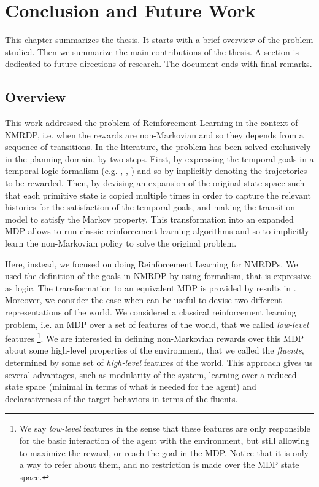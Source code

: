 \chapter{Conclusion and Future Work}\label{ch:conclusions}
This chapter summarizes the thesis. It starts with a brief overview of the problem studied. Then we summarize the main contributions of the thesis. A section is dedicated to future directions of research. The document ends with final remarks.
\section{Overview}
This work addressed the problem of Reinforcement Learning in the context of NMRDP, i.e. when the rewards are non-Markovian and so they depends from a sequence of transitions. In the literature, the problem has been solved exclusively in the planning domain, by two steps. First, by expressing the temporal goals in a temporal logic formalism (e.g. \PLTL, \FLTL, \LTLf) and so by implicitly denoting the trajectories to be rewarded. Then, by devising an expansion of the original state space such that each primitive state is copied multiple times in order to capture the relevant histories for the satisfaction of the temporal goals, and making the transition model to satisfy the Markov property. This transformation into an expanded MDP allows to run classic reinforcement learning algorithms and so to implicitly learn the non-Markovian policy to solve the original problem.

Here, instead, we focused on doing Reinforcement Learning for NMRDPs.
We used the definition of the goals in NMRDP by using \LDLf formalism, that is expressive as \MSO logic. The transformation to an equivalent MDP is provided by results in \citep{AAAI1817342}. Moreover, we consider the case when can be useful to devise two different representations of the world. We considered a classical reinforcement learning problem, i.e. an MDP over a set of features of the world, that we called \emph{low-level} features
\footnote{We say \emph{low-level} features in the sense that these features are only responsible for the basic interaction of the agent with the environment, but still allowing to maximize the reward, or reach the goal in the MDP. Notice that it is only a way to refer about them, and no restriction is made over the MDP state space.}.
We are interested in defining non-Markovian rewards over this MDP about some high-level properties of the environment, that we called the \emph{fluents}, determined by some set of \emph{high-level} features of the world. This approach gives us several advantages, such as modularity of the system, learning over a reduced state space (minimal in terms of what is needed for the agent) and declarativeness of the target behaviors in terms of the fluents.

